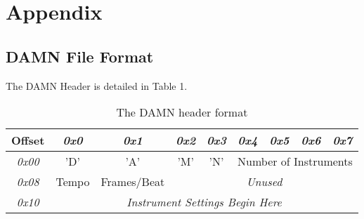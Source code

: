 \documentclass[11pt]{article}
\begin{document}
\pagebreak

\section*{Appendix}
\subsection*{DAMN File Format}
The DAMN Header is detailed in Table 1.
\begin{table}[]
\centering
\caption{The DAMN header format}
\label{my-label}
\begin{tabular}{|c|c|c|c|c|c|c|c|c|}
\hline
\textbf{Offset} & \textit{0x0} & \textit{0x1} & \textit{0x2} & \textit{0x3} & \textit{0x4} & \textit{0x5} & \textit{0x6} & \textit{0x7} \\ \hline
\textit{0x00}   & 'D'          & 'A'          & 'M'          & 'N'          & \multicolumn{4}{c|}{Number of Instruments}                \\ \hline
\textit{0x08}   & Tempo        & Frames/Beat  & \multicolumn{6}{c|}{\textit{Unused}}                                                    \\ \hline
\textit{0x10}   & \multicolumn{8}{c|}{\textit{Instrument Settings Begin Here}}                                                          \\ \hline
\end{tabular}
\end{table}
\end{document}
